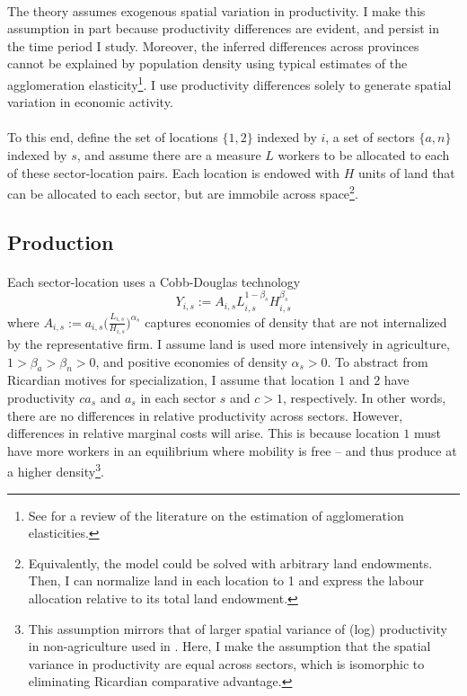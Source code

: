 \documentclass[]{article}
\theoremstyle{plain}
\begin{document}
\paragraph*{}
 The theory assumes exogenous spatial variation in productivity. I make this assumption in part because productivity differences are evident, and persist in the time period I study.  Moreover, the inferred differences across provinces cannot be explained by population density using typical estimates of the agglomeration elasticity\footnote{See \citet{combesg2015} for a review of the literature on the estimation of agglomeration elasticities.}. I use productivity differences solely to generate spatial variation in economic activity. 

\paragraph*{}
To this end, define the set of locations $\{1, 2\}$ indexed by $i$, a set of sectors $\{a, n\}$ indexed by $s$, and assume there are a measure $L$ workers to be allocated to each of these sector-location pairs. Each location is endowed with $H$ units of land that can be allocated to each sector, but are immobile across space\footnote{Equivalently, the model could be solved with arbitrary land endowments. Then, I can normalize land in each location to 1 and express the labour allocation relative to its total land endowment.}. 

\subsection*{Production}
\paragraph*{}
 Each sector-location uses a Cobb-Douglas technology
\begin{equation*}
	Y_{i, s} := A_{i, s}L_{i, s}^{1-\beta_{s}}H_{i, s}^{\beta_{s}}
\end{equation*}
where $A_{i,s} := a_{i, s}\big(\frac{L_{i, s}}{H_{i, s}}\big)^{\alpha_{s}}$ captures economies of density that are not internalized by the representative firm. I assume land is used more intensively in agriculture, $1 >\beta_{a} > \beta_{n} > 0$, and positive economies of density $\alpha_{s} > 0$.  To abstract from Ricardian motives for specialization, I assume that location $1$ and $2$ have productivity $ca_{s}$ and $a_{s}$ in each sector $s$ and $c>1$, respectively. In other words, there are no differences in relative productivity across sectors. However, differences in relative marginal costs will arise. This is because location $1$ must have more workers in an equilibrium where mobility is free -- and thus produce at a higher density\footnote{This assumption mirrors that of larger spatial variance of (log) productivity in non-agriculture used in \cite{urbstruct}. Here, I make the assumption that the spatial variance in productivity are equal across sectors, which is isomorphic to eliminating Ricardian comparative advantage.}. 
\end{document}
